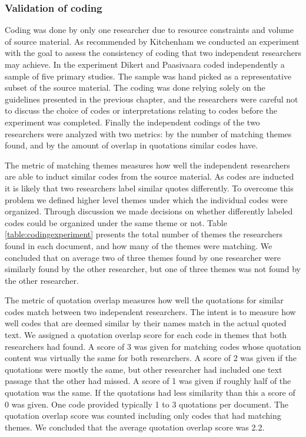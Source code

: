 \documentclass[preprint,authoryear,12pt]{elsarticle}
\begin{document}
\subsubsection{Validation of coding}

Coding was done by only one researcher due to resource constraints and volume of
source material. As recommended by Kitchenham \cite{Kitchenham2007} we conducted
an experiment with the goal to assess the consistency of coding that two
independent researchers may achieve.
In the experiment Dikert and Paasivaara coded independently a sample of five
primary studies. The sample was hand picked as a representative subset of the
source material. The coding was done relying solely on the guidelines presented
in the previous chapter, and the researchers were careful not to discuss the
choice of codes or interpretations relating to codes before the experiment was
completed. Finally the independent codings of the two researchers were analyzed
with two metrics: by the number of matching themes found, and by the amount of
overlap in quotations similar codes have.

The metric of matching themes measures how well the independent researchers are
able to induct similar codes from the source material. As codes are inducted it
is likely that two researchers label similar quotes differently. To overcome
this problem we defined higher level themes under which the individual codes
were organized. Through discussion we made decisions on whether differently
labeled codes could be organized under the same theme or not. Table
\ref{table:codingexperiment} presents the total number of themes the researchers
found in each document, and how many of the themes were matching. We concluded
that on average two of three themes found by one researcher were similarly found
by the other researcher, but one of three themes was not found by the other
researcher.

The metric of quotation overlap measures how well the quotations for similar
codes match between two independent researchers. The intent is to measure how
well codes that are deemed similar by their names match in the actual quoted
text. We assigned a quotation overlap score for each code in themes that both
researchers had found. A score of 3 was given for matching codes whose quotation
content was virtually the same for both researchers. A score of 2 was given if
the quotations were mostly the same, but other researcher had included one text
passage that the other had missed. A score of 1 was given if roughly half of the
quotation was the same. If the quotations had less similarity than this a score
of 0 was given. One code provided typically 1 to 3 quotations per document. The
quotation overlap score was counted including only codes that had matching
themes. We concluded that the average quotation overlap score was 2.2.
\end{document}
